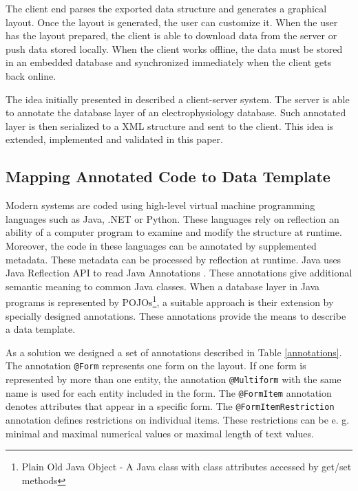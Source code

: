 \documentclass[conference]{IEEEtran}
\begin{document}
The client end parses the exported data structure and generates a graphical layout. Once the layout is generated, the user can customize it. When the user has the layout prepared, the client is able to download data from the server or push data stored locally. When the client works offline, the data must be stored in an embedded database and synchronized immediately when the client gets back online.



The idea initially presented in \cite{6645264} described a client-server system. The server is able to annotate the database layer of an electrophysiology database. Such annotated layer is then serialized to a XML structure and sent to the client. This idea is extended, implemented and validated in this paper.

\subsection{Mapping Annotated Code to Data Template}\label{Mapping_Code_To_Template}

Modern systems are coded using high-level virtual machine programming languages such as Java, .NET or Python. These languages rely on reflection an ability of a computer program to examine and modify the structure at runtime. Moreover, the code in these languages can be annotated by supplemented metadata. These metadata can be processed by reflection at runtime. Java uses Java Reflection API \cite{1932394184} to read Java Annotations \cite{AnnotationsJavaDevGuide}. These annotations give additional semantic meaning to common Java classes. When a database layer in Java programs is represented by POJOs\footnote{Plain Old Java Object - A Java class with class attributes accessed by get/set methods}, a suitable approach is their extension by specially designed annotations. These annotations provide the means to describe a data template.

As a solution we designed a set of annotations described in Table \ref{annotations}. The annotation \texttt{@Form} represents one form on the layout. If one form is represented by more than one entity, the annotation \texttt{@Multiform} with the same name is used for each entity included in the form. The \texttt{@FormItem} annotation denotes attributes that appear in a specific form. The \texttt{@FormItemRestriction} annotation defines restrictions on individual items. These restrictions can be e. g. minimal and maximal numerical values or maximal length of text values.
\end{document}
